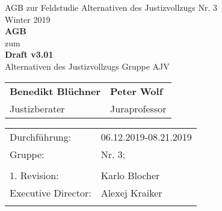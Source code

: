 \documentclass[a4paper, 12pt]{scrartcl}
\begin{document}
    \begin{titlepage}
        \begin{center}
            
	    \large {AGB zur Feldstudie \dq Alternativen des Justizvollzugs{\dq} Nr. 3} \\
            Winter 2019 \\
            \vspace{3cm}
            \textbf{ \Huge AGB} \\
            \vspace{0.5cm}
            \large zum \\
            \vspace{1.5cm}
            \textbf{ \Large Draft v3.01} \\
            \large Alternativen des Justizvollzugs Gruppe AJV

            \vspace{3cm}
            \setlength\extrarowheight{3pt}
            \begin{tabularx}{\textwidth}{CC}
            \textbf{Benedikt Bl\"uchner} & \textbf{Peter Wolf} \\
            Justizberater & Juraprofessor\\
            \end{tabularx}
           
            \vspace{4cm}
            
            \begin{tabularx}{\textwidth}{XX}
               Durchführung: &  06.12.2019-08.21.2019 \\ 
               Gruppe: & Nr. 3;  \\ \\
		1. Revision: & Karlo Blocher \\
		Executive Director: &Alexej Kraiker  \\ \\
            \end{tabularx}
         \end{center}
    \end{titlepage}
\end{document}
